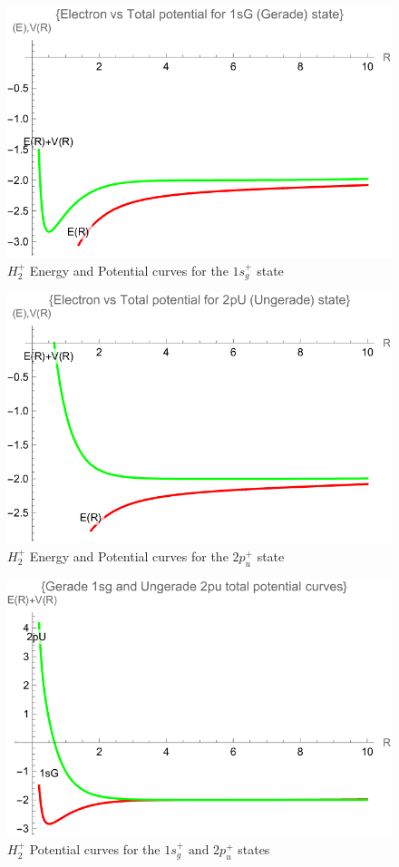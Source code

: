 \begin{figure}
  \includegraphics{H2_1sG-Potential.png}
  \caption{$ H_2^{+} $ Energy and Potential curves for the $ 1s_g^{+} $ state}
\end{figure}

\begin{figure}
  \includegraphics{H2_2pU-Potential.png}
  \caption{$ H_2^{+} $ Energy and Potential curves for the $ 2p_u^{+} $ state}
\end{figure}


\begin{figure}
  \includegraphics{	H2_sGpU-Potential.png}
  \caption{$ H_2^{+} $ Potential curves for the $ 1s_g^{+}\,\, \text{and}\,\, 2p_u^{+} $ states}
\end{figure}
